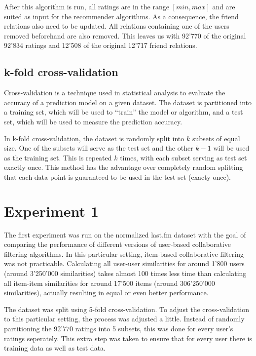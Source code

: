 After this algorithm is run, all ratings are in the range $[min,max]$ and are suited as input for the recommender algorithms. As a consequence, the friend relations also need to be updated. All relations containing one of the users removed beforehand are also removed. This leaves us with 92'770 of the original 92'834 ratings and 12'508 of the original 12'717 friend relations.

\subsection{k-fold cross-validation}
\label{kfoldcrossvalidation} Cross-validation is a technique used in statistical analysis to evaluate the accuracy of a prediction model on a given dataset. The dataset is partitioned into a training set, which will be used to ``train'' the model or algorithm, and a test set, which will be used to measure the prediction accuracy.

In k-fold cross-validation, the dataset is randomly split into $k$ subsets of equal size. One of the subsets will serve as the test set and the other $k-1$ will be used as the training set. This is repeated $k$ times, with each subset serving as test set exactly once. This method has the advantage over completely random splitting that each data point is guaranteed to be used in the test set (exacty once).

\section{Experiment 1}
\label{st:experiment1} The first experiment was run on the normalized last.fm dataset with the goal of comparing the performance of different versions of user-based collaborative filtering algorithms. In this particular setting, item-based collaborative filtering was not practicable. Calculating all user-user similarities for around 1'800 users (around 3'250'000 similarities) takes almost 100 times less time than calculating all item-item similarities for around 17'500 items (around 306'250'000 similarities), actually resulting in equal or even better performance.

The dataset was split using 5-fold cross-validation. To adjust the cross-validation to this particular setting, the process was adjusted a little. Instead of randomly partitioning the 92'770 ratings into 5 subsets, this was done for every user's ratings seperately. This extra step was taken to ensure that for every user there is training data as well as test data.

